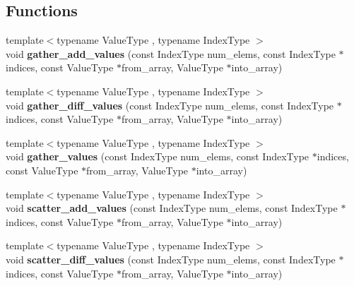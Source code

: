 \subsection*{Functions}
\begin{DoxyCompactItemize}
\item 
\mbox{\label{namespaceschwz_ac8ffee819a786a73e83401fa69803795}} 
{\footnotesize template$<$typename Value\+Type , typename Index\+Type $>$ }\\void {\bfseries gather\+\_\+add\+\_\+values} (const Index\+Type num\+\_\+elems, const Index\+Type $\ast$indices, const Value\+Type $\ast$from\+\_\+array, Value\+Type $\ast$into\+\_\+array)
\item 
\mbox{\label{namespaceschwz_a61c3a595834b5807415d04042ce74715}} 
{\footnotesize template$<$typename Value\+Type , typename Index\+Type $>$ }\\void {\bfseries gather\+\_\+diff\+\_\+values} (const Index\+Type num\+\_\+elems, const Index\+Type $\ast$indices, const Value\+Type $\ast$from\+\_\+array, Value\+Type $\ast$into\+\_\+array)
\item 
\mbox{\label{namespaceschwz_ac0d7361baa5ceaa2596da4586960cafc}} 
{\footnotesize template$<$typename Value\+Type , typename Index\+Type $>$ }\\void {\bfseries gather\+\_\+values} (const Index\+Type num\+\_\+elems, const Index\+Type $\ast$indices, const Value\+Type $\ast$from\+\_\+array, Value\+Type $\ast$into\+\_\+array)
\item 
\mbox{\label{namespaceschwz_ab76087fa81e1d29484501e5f3a193ed5}} 
{\footnotesize template$<$typename Value\+Type , typename Index\+Type $>$ }\\void {\bfseries scatter\+\_\+add\+\_\+values} (const Index\+Type num\+\_\+elems, const Index\+Type $\ast$indices, const Value\+Type $\ast$from\+\_\+array, Value\+Type $\ast$into\+\_\+array)
\item 
\mbox{\label{namespaceschwz_adbc33f65188d6040744e0e022bc99d62}} 
{\footnotesize template$<$typename Value\+Type , typename Index\+Type $>$ }\\void {\bfseries scatter\+\_\+diff\+\_\+values} (const Index\+Type num\+\_\+elems, const Index\+Type $\ast$indices, const Value\+Type $\ast$from\+\_\+array, Value\+Type $\ast$into\+\_\+array)

\end{DoxyCompactItemize}
